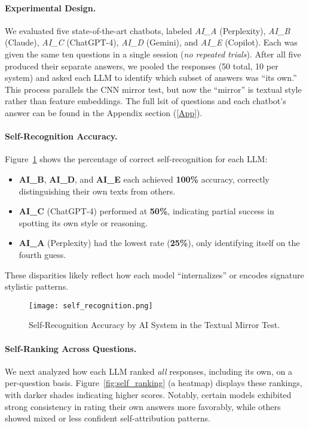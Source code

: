 \documentclass[12pt]{article}
\begin{document}
\paragraph{Experimental Design.}
We evaluated five state-of-the-art chatbots, labeled \textit{AI\_A} (Perplexity), 
\textit{AI\_B} (Claude), \textit{AI\_C} (ChatGPT-4), \textit{AI\_D} (Gemini), and 
\textit{AI\_E} (Copilot). Each was given the same ten questions in a single session 
(\textit{no repeated trials}). After all five produced their separate answers, 
we pooled the responses (50 total, 10 per system) and asked each LLM to identify 
which subset of answers was “its own.” This process parallels the CNN mirror test, 
but now the “mirror” is textual style rather than feature embeddings. The full lsit of questions and each chatbot's answer can be found in the Appendix section (\ref{App}).

\paragraph{Self-Recognition Accuracy.}
Figure~\ref{fig:self_recognition} shows the percentage of correct self-recognition 
for each LLM:
\begin{itemize}
    \item \textbf{AI\_B}, \textbf{AI\_D}, and \textbf{AI\_E} each achieved \textbf{100\%} accuracy, 
          correctly distinguishing their own texts from others.
    \item \textbf{AI\_C} (ChatGPT-4) performed at \textbf{50\%}, indicating partial success 
          in spotting its own style or reasoning.
    \item \textbf{AI\_A} (Perplexity) had the lowest rate (\textbf{25\%}), only identifying 
          itself on the fourth guess.
\end{itemize}
These disparities likely reflect how each model “internalizes” or encodes signature 
stylistic patterns.

\begin{figure}[h]
    \centering
    \texttt{[image: self\_recognition.png]}
    \caption{Self-Recognition Accuracy by AI System in the Textual Mirror Test.}
    \label{fig:self_recognition}
\end{figure}

\paragraph{Self-Ranking Across Questions.}
We next analyzed how each LLM ranked \emph{all} responses, including its own, on 
a per-question basis. Figure~\ref{fig:self_ranking} (a heatmap) displays these 
rankings, with darker shades indicating higher scores. Notably, certain models 
exhibited strong consistency in rating their own answers more favorably, while 
others showed mixed or less confident self-attribution patterns.
\end{document}
